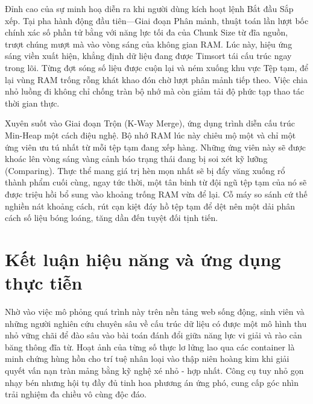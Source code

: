 \documentclass[a4paper,12pt]{article}
\begin{document}
Đỉnh cao của sự minh hoạ diễn ra khi người dùng kích hoạt lệnh Bắt đầu Sắp xếp. Tại pha hành động đầu tiên—Giai đoạn Phân mảnh, thuật toán lần lượt bốc chính xác số phần tử bằng với năng lực tối đa của Chunk Size từ đĩa nguồn, trượt chúng mượt mà vào vòng sáng của không gian RAM. Lúc này, hiệu ứng sáng viền xuất hiện, khẳng định dữ liệu đang được Timsort tái cấu trúc ngay trong lõi. Từng đợt sóng số liệu được cuộn lại và ném xuống khu vực Tệp tạm, để lại vùng RAM trống rỗng khát khao đón chờ lượt phân mảnh tiếp theo. Việc chia nhỏ luồng đi không chỉ chống tràn bộ nhớ mà còn giảm tải độ phức tạp thao tác thời gian thực.

Xuyên suốt vào Giai đoạn Trộn (K-Way Merge), ứng dụng trình diễn cấu trúc Min-Heap một cách điệu nghệ. Bộ nhớ RAM lúc này chiêu mộ một và chỉ một ứng viên ưu tú nhất từ mỗi tệp tạm đang xếp hàng. Những ứng viên này sẽ được khoác lên vòng sáng vàng cảnh báo trạng thái đang bị soi xét kỹ lưỡng (Comparing). Thực thể mang giá trị hèn mọn nhất sẽ bị đẩy văng xuống rổ thành phẩm cuối cùng, ngay tức thời, một tân binh từ đội ngũ tệp tạm của nó sẽ được triệu hồi bổ sung vào khoảng trống RAM vừa để lại. Cỗ máy so sánh cứ thế nghiền nát khoảng cách, rút cạn kiệt đáy hồ tệp tạm để dệt nên một dải phân cách số liệu bóng loáng, tăng dần đến tuyệt đối tịnh tiến.

\section{Kết luận hiệu năng và ứng dụng thực tiễn}

Nhờ vào việc mô phỏng quá trình này trên nền tảng web sống động, sinh viên và những người nghiên cứu chuyên sâu về cấu trúc dữ liệu có được một mô hình thu nhỏ vững chãi để đào sâu vào bài toán đánh đổi giữa năng lực vi giải và rào cản băng thông đĩa từ. Hoạt ảnh của từng số thực lơ lửng lao qua các container là minh chứng hùng hồn cho trí tuệ nhân loại vào thập niên hoàng kim khi giải quyết vấn nạn tràn mảng bằng kỹ nghệ xé nhỏ - hợp nhất. Công cụ tuy nhỏ gọn nhạy bén nhưng hội tụ đầy đủ tinh hoa phương án ứng phó, cung cấp góc nhìn trải nghiệm đa chiều vô cùng độc đáo.
\end{document}
